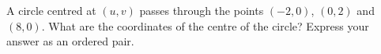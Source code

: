 A circle centred at $(u,v)$ passes through the points $(-2,0)$, $(0,2)$ and $(8,0)$. What are the coordinates of the centre of the circle? Express your answer as an ordered pair.
